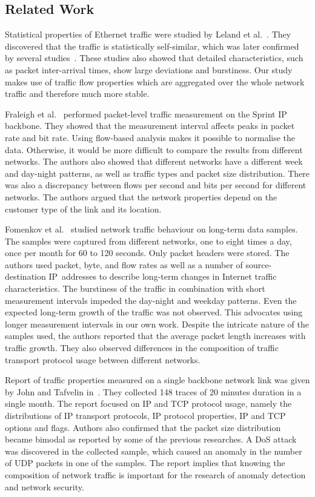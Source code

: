 \subsection{Related Work} \label{subsec:characterization-related_work}

Statistical properties of Ethernet traffic were studied by Leland et al.~\cite{Leland-1993-Self}. They discovered that the traffic is statistically self-similar, which was later confirmed by several studies~\cite{Crovella-1997-Self, Paxson-1995-Wide}. These studies also showed that detailed characteristics, such as packet inter-arrival times, show large deviations and burstiness. Our study makes use of traffic flow properties which are aggregated over the whole network traffic and therefore much more stable.

Fraleigh et al.~\cite{Fraleigh-2003-Packet} performed packet-level traffic measurement on the Sprint IP backbone. They showed that the measurement interval affects peaks in packet rate and bit rate. Using flow-based analysis makes it possible to normalise the data. Otherwise, it would be more difficult to compare the results from different networks. The authors also showed that different networks have a different week and day-night patterns, as well as traffic types and packet size distribution. There was also a discrepancy between flows per second and bits per second for different networks. The authors argued that the network properties depend on the customer type of the link and its location.

Fomenkov et al.~\cite{Fomenkov-2004-Longitudinal} studied network traffic behaviour on long-term data samples. The samples were captured from different networks, one to eight times a day, once per month for 60 to 120 seconds. Only packet headers were stored. The authors used packet, byte, and flow rates as well as a number of \mbox{source-destination} IP~addresses to describe long-term changes in Internet traffic characteristics. The burstiness of the traffic in combination with short measurement intervals impeded the day-night and weekday patterns. Even the expected long-term growth of the traffic was not observed. This advocates using longer measurement intervals in our own work. Despite the intricate nature of the samples used, the authors reported that the average packet length increases with traffic growth. They also observed differences in the composition of traffic transport protocol usage between different networks.

Report of traffic properties measured on a single backbone network link was given by John and Tafvelin in~\cite{John-2007-Analysis}. They collected 148 traces of 20 minutes duration in a single month. The report focused on IP and TCP protocol usage, namely the distributions of IP transport protocols, IP protocol properties, IP and TCP options and flags. Authors also confirmed that the packet size distribution became bimodal as reported by some of the previous researches. A DoS attack was discovered in the collected sample, which caused an anomaly in the number of UDP packets in one of the samples. The report implies that knowing the composition of network traffic is important for the research of anomaly detection and network security.

